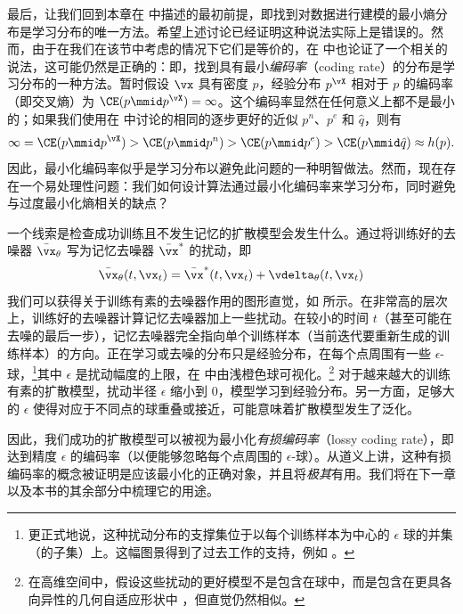 \documentclass[../../book-main_zh.tex]{subfiles}
\begin{document}
最后，让我们回到本章在  中描述的最初前提，即找到对数据进行建模的最小熵分布是学习分布的唯一方法。希望上述讨论已经证明这种说法实际上是错误的。然而，由于在我们在该节中考虑的情况下它们是等价的，在  中也论证了一个相关的说法，这可能仍然是正确的：即，找到具有最小\textit{编码率}（coding rate）的分布是学习分布的一种方法。暂时假设 \(\vx\) 具有密度 \(p\)，经验分布 \(p^{\vX}\) 相对于 \(p\) 的编码率（即交叉熵）为 \(\CE(p \mmid p^{\vX}) = \infty\)。这个编码率显然在任何意义上都不是最小的；如果我们使用在  中讨论的相同的逐步更好的近似 \(p^{n}\)、\(p^{e}\) 和 \(\hat{q}\)，则有
\begin{equation}
    \infty = \CE(p \mmid p^{\vX}) > \CE(p \mmid p^{n}) > \CE(p \mmid
    p^{e}) > \CE(p \mmid \hat{q}) \approx h(p).
\end{equation}
因此，最小化编码率似乎是学习分布以避免此问题的一种明智做法。然而，现在存在一个易处理性问题：我们如何设计算法通过最小化编码率来学习分布，同时避免与过度最小化熵相关的缺点？

一个线索是检查成功训练且不发生记忆的扩散模型会发生什么。通过将训练好的去噪器 \(\bar{\vx}_{\theta}\) 写为记忆去噪器 \(\bar{\vx}^{\ast}\) 的扰动，即
\begin{equation}
    \bar{\vx}_{\theta}(t, \vx_{t}) = \bar{\vx}^{\ast}(t, \vx_{t}) +
    \vdelta_{\theta}(t, \vx_{t})
\end{equation}
我们可以获得关于训练有素的去噪器作用的图形直觉，如  所示。在非常高的层次上，训练好的去噪器计算记忆去噪器加上一些扰动。在较小的时间 \(t\)（甚至可能在去噪的最后一步），记忆去噪器完全指向单个训练样本（当前迭代要重新生成的训练样本）的方向。正在学习或去噪的分布只是经验分布，在每个点周围有一些 \(\epsilon\)-球，\footnote{更正式地说，这种扰动分布的支撑集位于以每个训练样本为中心的 \(\epsilon\) 球的并集（的子集）上。这幅图景得到了过去工作的支持，例如 \cite{song2025selective}。}其中 \(\epsilon\) 是扰动幅度的上限，在  中由浅橙色球可视化。\footnote{在高维空间中，假设这些扰动的更好模型不是包含在球中，而是包含在更具各向异性的几何自适应形状中 \cite{farghly2025diffusion}，但直觉仍然相似。} 对于越来越大的训练有素的扩散模型，扰动半径 \(\epsilon\) 缩小到 \(0\)，模型学习到经验分布。另一方面，足够大的 \(\epsilon\) 使得对应于不同点的球重叠或接近，可能意味着扩散模型发生了泛化。

因此，我们成功的扩散模型可以被视为最小化\textit{有损编码率}（lossy coding rate），即达到精度 \(\epsilon\) 的编码率（以便能够忽略每个点周围的 \(\epsilon\)-球）。从道义上讲，这种有损编码率的概念被证明是应该最小化的正确对象，并且将\textit{极其}有用。我们将在下一章  以及本书的其余部分中梳理它的用途。
\end{document}
